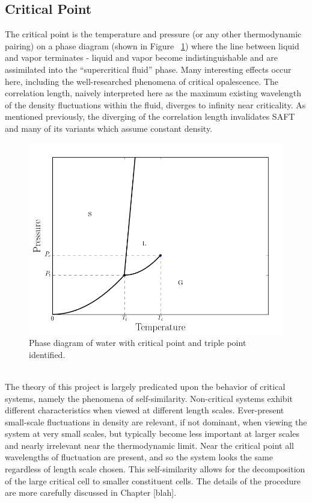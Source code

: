 \documentclass[12pt]{article}
\begin{document}
\subsection{Critical Point} 
The critical point is the temperature and pressure (or any other thermodynamic pairing) on a phase diagram (shown in Figure ~\ref{phase}) where the line between liquid and vapor terminates - liquid and vapor become indistinguishable and are assimilated into the ``supercritical fluid'' phase. Many interesting effects occur here, including the well-researched phenomena of critical opalescence. The correlation length, naively interpreted here as the maximum existing wavelength of the density fluctuations within the fluid, diverges to infinity near criticality. As mentioned previously, the diverging of the correlation length invalidates SAFT and many of its variants which assume constant density. 
\begin{figure}
    \centering
    \includegraphics[width=.75\textwidth]{phase.png}
    \caption{Phase diagram of water with critical point and triple point identified.}
    \label{phase}
\end{figure}
\\
The theory of this project is largely predicated upon the behavior of critical systems, namely the phenomena of self-similarity. Non-critical systems exhibit different characteristics when viewed at different length scales. Ever-present small-scale fluctuations in density are relevant, if not dominant, when viewing the system at very small scales, but typically become less important at larger scales and nearly irrelevant near the thermodynamic limit. Near the critical point all wavelengths of fluctuation are present, and so the system looks the same regardless of length scale chosen. This self-similarity allows for the decomposition of the large critical cell to smaller constituent cells. The details of the procedure are more carefully discussed in Chapter {\color{red} [blah]}.
\end{document}
